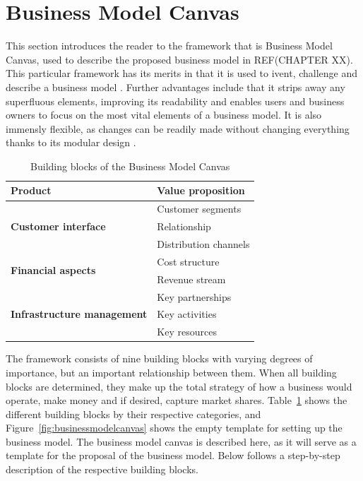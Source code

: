 \section{Business Model Canvas}
This section introduces the reader to the framework that is Business Model Canvas, used to describe the proposed business model in REF(CHAPTER XX). This particular framework has its merits in that it is used to ivent, challenge and describe a business model \cite{strategyzer2016}. Further advantages include that it strips away any superfluous elements, improving its readability and enables users and business owners to focus on the most vital elements of a business model. It is also immensly flexible, as changes can be readily made without changing everything thanks to its modular design \cite{osterwalder2013business}. 
\newline
\\
\begin{table}[H]
\centering
\caption{Building blocks of the Business Model Canvas}
\label{tab:canvas}
\begin{tabular}{|l|l|}
\hline
\textbf{Product}                                    & Value proposition     \\ \hline
\multirow{3}{*}{\textbf{Customer interface}}        & Customer segments     \\ \cline{2-2} 
                                                    & Relationship          \\ \cline{2-2} 
                                                    & Distribution channels \\ \hline
\multirow{2}{*}{\textbf{Financial aspects}}         & Cost structure        \\ \cline{2-2} 
                                                    & Revenue stream        \\ \hline
\multirow{3}{*}{\textbf{Infrastructure management}} & Key partnerships      \\ \cline{2-2} 
                                                    & Key activities        \\ \cline{2-2} 
                                                    & Key resources         \\ \hline
\end{tabular}
\end{table}

The framework consists of nine building blocks with varying degrees of importance, but an important relationship between them. When all building blocks are determined, they make up the total strategy of how a business would operate, make money and if desired, capture market shares. Table~\ref{tab:canvas} shows the different building blocks by their respective categories, and Figure~\ref{fig:businessmodelcanvas} shows the empty template for setting up the business model. The business model canvas is described here, as it will serve as a template for the proposal of the business model. Below follows a step-by-step description of the respective building blocks.


